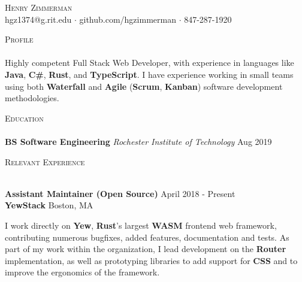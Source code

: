 \documentclass[a4paper]{article}
\newcommand{\lineunder} {
    \vspace*{-8pt} \\
    \hspace*{-18pt} \hrulefill \\
}
\newcommand{\header} [1] {
    {\hspace*{-18pt}\vspace*{6pt} \textsc{#1}}
    \vspace*{-6pt} \lineunder
}
\begin{document}
\vspace*{-40pt}

    

\vspace*{-10pt}
\begin{center}
	{\Huge \scshape {Henry Zimmerman}}\\
	hgz1374@g.rit.edu $\cdot$ github.com/hgzimmerman $\cdot$ 847-287-1920 \\
\end{center}



\header{Profile}
    Highly competent Full Stack Web Developer, with experience in languages like \textbf{Java}, \textbf{C\#}, \textbf{Rust}, and \textbf{TypeScript}.
    I have experience working in small teams using both \textbf{Waterfall} and \textbf{Agile} (\textbf{Scrum}, \textbf{Kanban}) software development methodologies.

\header{Education}
    \textbf{BS Software Engineering} \textit{Rochester Institute of Technology}  \hfill  Aug 2019\\
\vspace{2mm}

\header{Relevant Experience}
\vspace{1mm}

\textbf{Assistant Maintainer (Open Source)}  \hfill April 2018 - Present\\
\textbf{YewStack} \hfill Boston, MA

\begin{addmargin}[1em]{2em}%
    I work directly on \textbf{Yew}, \textbf{Rust}'s largest \textbf{WASM} frontend web framework, contributing numerous bugfixes, added features, documentation and tests.
    As part of my work within the organization, I lead development on the \textbf{Router} implementation, as well as prototyping libraries to add support for \textbf{CSS} and to improve the ergonomics of the framework. 
\vspace*{2mm}

\end{addmargin}
\end{document}
